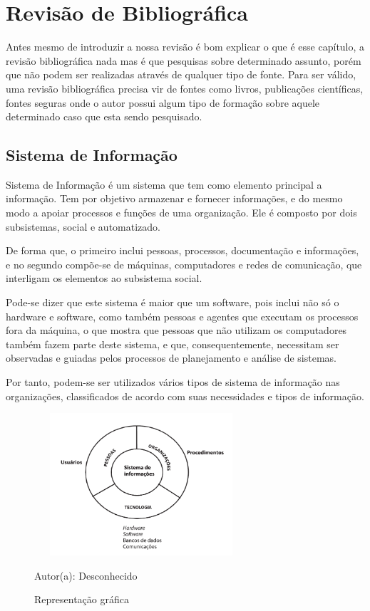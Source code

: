 \section{Revisão de Bibliográfica}
\vspace*{1cm}
Antes mesmo de introduzir a nossa revisão é bom explicar o que é esse capítulo, a revisão bibliográfica nada mas é que pesquisas sobre determinado assunto, porém que não podem ser realizadas através de qualquer tipo de fonte. Para ser válido, uma
revisão bibliográfica precisa vir de fontes como livros, publicações científicas, fontes seguras onde o autor possui algum tipo de formação sobre aquele determinado
caso que esta sendo pesquisado.

\subsection{Sistema de Informação}
  
Sistema de Informação é um sistema que tem como elemento principal a informação. Tem por objetivo armazenar e fornecer informações, e do mesmo modo a apoiar processos e funções de uma organização. 
Ele é composto por dois subsistemas, social e automatizado.

De forma que, o primeiro inclui pessoas, processos, documentação e informações, e no segundo compõe-se de máquinas, computadores e redes de comunicação, que interligam os elementos ao subsistema social. 

Pode-se dizer que este sistema é maior que um software, pois inclui não só o hardware e software, como também pessoas e agentes que executam os processos fora da máquina, o que mostra que pessoas que não utilizam os computadores também fazem parte deste sistema, e que, consequentemente, necessitam ser observadas e guiadas pelos processos de planejamento e análise de sistemas. 

Por tanto, podem-se ser utilizados vários tipos de sistema de informação nas organizações, classificados de acordo com suas necessidades e tipos de informação.
 \begin{figure}[!h]
	\centering
	\caption{Representação gráfica}
	\includegraphics[width=300px, height=200px]{./images/2-1.png}
	\par{Autor(a): Desconhecido}
\end{figure}
